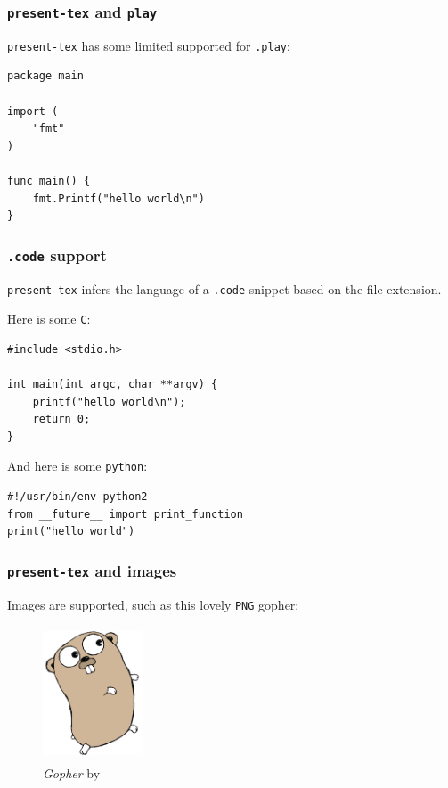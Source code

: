 \documentclass[9pt]{beamer}
\newcommand{\colhref}[3][blue]{\href{#2}{\color{#1}{#3}}}%
\begin{document}
\begin{frame}[fragile]
\frametitle{\texttt{present-tex} and \texttt{play}}

\texttt{present-tex} has some limited supported for \texttt{.play}:


\begin{verbatim}
package main

import (
	"fmt"
)

func main() {
	fmt.Printf("hello world\n")
}

\end{verbatim}

\end{frame}

\begin{frame}[fragile]
\frametitle{\texttt{.code} support}

\texttt{present-tex} infers the language of a \texttt{.code} snippet based on the file extension.


Here is some \texttt{C}:


\begin{verbatim}
#include <stdio.h>

int main(int argc, char **argv) {
	printf("hello world\n");
	return 0;
}

\end{verbatim}

And here is some \texttt{python}:


\begin{verbatim}
#!/usr/bin/env python2
from __future__ import print_function
print("hello world")

\end{verbatim}

\end{frame}

\begin{frame}[fragile]
\frametitle{\texttt{present-tex} and images}

Images are supported, such as this lovely \texttt{PNG} gopher:


\begin{figure}[h]
\begin{center}
\includegraphics[width=3cm,height=4cm]{_figs/gopher.png}
\end{center}
\caption{\emph{Gopher} by \colhref{http://www.reneefrench.com}{\texttt{Ren\'ee French}}}
\end{figure}

\end{frame}
\end{document}

